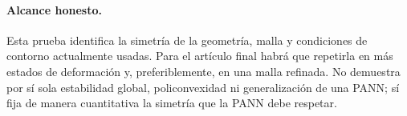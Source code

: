 \documentclass[11pt,a4paper]{article}
\begin{document}
\paragraph{Alcance honesto.} Esta prueba identifica la simetría de la
geometría, malla y condiciones de contorno actualmente usadas. Para el artículo
final habrá que repetirla en más estados de deformación y, preferiblemente, en
una malla refinada. No demuestra por sí sola estabilidad global, policonvexidad
ni generalización de una PANN; sí fija de manera cuantitativa la simetría que
la PANN debe respetar.
\end{document}
